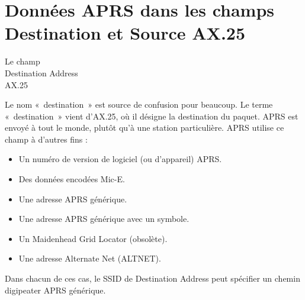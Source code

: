 \chapter[DONNÉES APRS DANS LES CHAMPS DESTINATION ET SOURCE AX.25]{Données APRS dans les champs Destination et Source
AX.25}\label{donnuxe9es-aprs-dans-les-champs-destination-et-source-ax.25}

\begin{aprssideblock}{Le champ\\Destination Address\\AX.25}
\label{le-champ-destination-address-ax.25}
Le nom «~destination~» est source de confusion pour beaucoup. Le terme
«~destination~» vient d'AX.25, où il désigne la destination du paquet.
APRS est envoyé à tout le monde, plutôt qu'à une station particulière.
APRS utilise ce champ à d'autres fins :

\begin{itemize}
\tightlist
\item
  Un numéro de version de logiciel (ou d'appareil) APRS.
\item
  Des données encodées Mic-E.
\item
  Une adresse APRS générique.
\item
  Une adresse APRS générique avec un symbole.
\item
  Un Maidenhead Grid Locator (obsolète).
\item
  Une adresse Alternate Net (ALTNET).
\end{itemize}

Dans chacun de ces cas, le SSID de Destination Address peut spécifier un
chemin digipeater APRS générique.
\end{aprssideblock}

